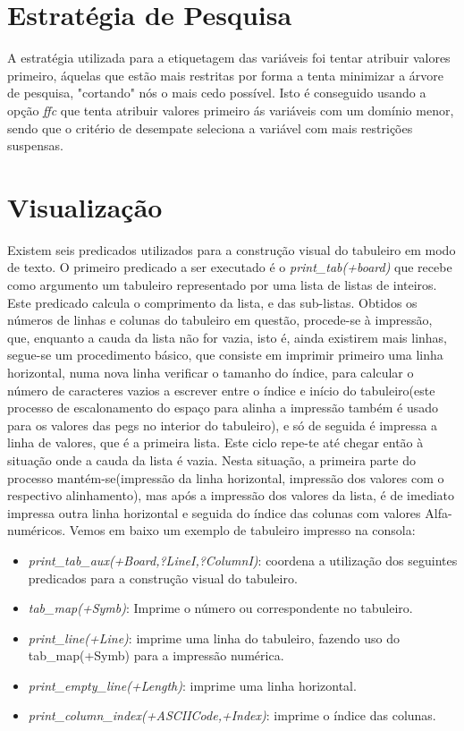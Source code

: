 \documentclass{llncs}
\begin{document}
\section{Estrat\'{e}gia de Pesquisa}

A estrat\'{e}gia utilizada para a etiquetagem das vari\'{a}veis foi tentar atribuir valores primeiro, \'{a}quelas que est\~{a}o mais restritas por forma a tenta minimizar a \'{a}rvore de pesquisa, "cortando" n\'{o}s o mais cedo poss\'{i}vel. Isto \'{e} conseguido usando a op\c{c}\~{a}o \emph{ffc} que tenta atribuir valores primeiro \'{a}s vari\'{a}veis com um dom\'{i}nio menor, sendo que o crit\'{e}rio de desempate seleciona a vari\'{a}vel com mais restri\c{c}\~{o}es suspensas.

\section{Visualiza\c{c}\~{a}o}
%
Existem seis predicados utilizados para a construção visual do tabuleiro em modo de texto. O primeiro predicado a ser executado é o \textit{print\_tab(+board)} que recebe como argumento um tabuleiro representado por uma lista de listas de inteiros. Este predicado calcula o comprimento da lista, e das sub-listas. Obtidos os números de linhas e colunas do tabuleiro em questão, procede-se à impressão, que, enquanto a cauda da lista não for vazia, isto é, ainda existirem mais linhas, segue-se um procedimento básico, que consiste em imprimir primeiro uma linha horizontal, numa nova linha verificar o tamanho do índice, para calcular o número de caracteres vazios a escrever entre o índice e início do tabuleiro(este processo de escalonamento do espaço para alinha a impressão também é usado para os valores das pegs no interior do tabuleiro), e só de seguida é impressa a linha de valores, que é a primeira lista. Este ciclo repe-te até chegar então à situação onde a cauda da lista é vazia. Nesta situação, a primeira parte do processo mantém-se(impressão da linha horizontal, impressão dos valores com o respectivo alinhamento), mas após a impressão dos valores da lista, é de imediato impressa outra linha horizontal e seguida do índice das colunas com valores Alfa-numéricos. 
Vemos em baixo um exemplo de tabuleiro impresso na consola:



\begin{itemize}
\item \textit{print\_tab\_aux(+Board,?LineI,?ColumnI)}: coordena a utiliza\c{c}\~{a}o dos seguintes predicados para a constru\c{c}\~{a}o visual do tabuleiro.
\item \textit{tab\_map(+Symb)}: Imprime o n\'{u}mero ou correspondente no tabuleiro.
\item \textit{print\_line(+Line)}: imprime uma linha do tabuleiro, fazendo uso do tab\_map(+Symb) para a impress\~{a}o num\'{e}rica.
\item \textit{print\_empty\_line(+Length)}: imprime uma linha horizontal.
\item \textit{print\_column\_index(+ASCIICode,+Index)}: imprime o \'{i}ndice das colunas.
\end{itemize}
\end{document}
